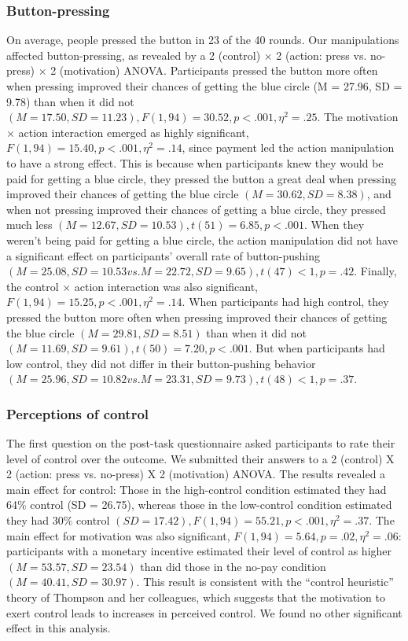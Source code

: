 \documentclass[USenglish,letterpaper,12pt,extrafontsizes,oneside,onecolumn,final]{memoir}
\begin{document}
\subsubsection{Button-pressing}
On average, people pressed the button in 23 of the 40 rounds. Our manipulations affected button-pressing, as revealed by a 2 (control) $\times$ 2 (action: press vs. no-press) $\times$ 2 (motivation) ANOVA. Participants pressed the button more often when pressing improved their chances of getting the blue circle (M = 27.96, SD = 9.78) than when it did not $(M = 17.50, SD = 11.23), F (1, 94) = 30.52, p < .001, \eta^2 = .25$. The motivation $\times$ action interaction emerged as highly significant, $F(1, 94) = 15.40, p < .001, \eta^2 = .14$, since payment led the action manipulation to have a strong effect. This is because when participants knew they would be paid for getting a blue circle, they pressed the button a great deal when pressing improved their chances of getting the blue circle $(M = 30.62, SD = 8.38)$, and when not pressing improved their chances of getting a blue circle, they pressed much less $(M = 12.67, SD = 10.53), t(51) = 6.85, p < .001$. When they weren't being paid for getting a blue circle, the action manipulation did not have a significant effect on participants' overall rate of button-pushing $(M = 25.08, SD = 10.53 vs. M = 22.72, SD = 9.65), t(47) < 1, p = .42$. Finally, the control $\times$ action interaction was also significant, $F(1, 94) = 15.25, p < .001, \eta^2 = .14$. When participants had high control, they pressed the button more often when pressing improved their chances of getting the blue circle $(M = 29.81, SD = 8.51)$ than when it did not $(M = 11.69, SD = 9.61), t(50) = 7.20, p < .001$. But when participants had low control, they did not differ in their button-pushing behavior $(M = 25.96, SD = 10.82 vs. M = 23.31, SD = 9.73), t(48) < 1, p = .37$.

\subsubsection{Perceptions of control}
The first question on the post-task questionnaire asked participants to rate their level of control over the outcome. We submitted their answers to a 2 (control) X 2 (action: press vs. no-press) X 2 (motivation) ANOVA. The results revealed a main effect for control: Those in the high-control condition estimated they had 64\% control (SD = 26.75), whereas those in the low-control condition estimated they had 30\% control $(SD = 17.42), F (1, 94) = 55.21, p < .001, \eta^2 = .37$. The main effect for motivation was also significant, $F(1, 94) = 5.64, p = .02, \eta^2 = .06$: participants with a monetary incentive estimated their level of control as higher $(M = 53.57, SD = 23.54)$ than did those in the no-pay condition $(M = 40.41, SD = 30.97)$. This result is consistent with the ``control heuristic'' theory of Thompson and her colleagues, which suggests that the motivation to exert control leads to increases in perceived control. We found no other significant effect in this analysis. 
\end{document}
